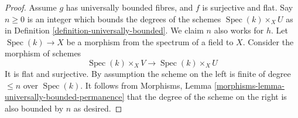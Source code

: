 \documentclass{stacks-project}
\theoremstyle{plain}
\theoremstyle{definition}
\theoremstyle{remark}
\numberwithin{equation}{subsection}
\def\Spec{\mathop{\mathrm{Spec}}}
\begin{document}
\begin{proof}
Assume $g$ has universally bounded fibres, and $f$ is surjective and flat.
Say $n \geq 0$ is an integer which bounds the degrees of the schemes
$\Spec(k) \times_X U$ as in
Definition \ref{definition-universally-bounded}.
We claim $n$ also works for $h$.
Let $\Spec(k) \to X$ be a morphism from the spectrum of a
field to $X$. Consider the morphism of schemes
$$
\Spec(k) \times_X V \longrightarrow \Spec(k) \times_X U
$$
It is flat and surjective. By assumption the scheme
on the left is finite of degree $\leq n$ over $\Spec(k)$.
It follows from
Morphisms, Lemma \ref{morphisms-lemma-universally-bounded-permanence}
that the degree of the scheme on the right is also bounded by $n$
as desired.
\end{proof}
\end{document}
